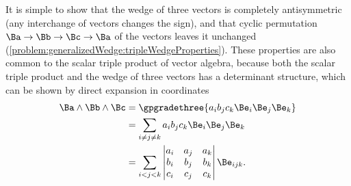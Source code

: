 It is simple to show that the wedge of three vectors is completely antisymmetric (any interchange of vectors changes the sign), and that cyclic permutation \( \Ba \rightarrow \Bb \rightarrow \Bc \rightarrow \Ba \) of the vectors leaves it unchanged
(\cref{problem:generalizedWedge:tripleWedgeProperties}).
These properties are also common to the scalar triple product of  vector algebra, because both the scalar triple product and the wedge of three vectors has a determinant structure, which can be shown by direct expansion in coordinates
\begin{equation}\label{eqn:generalizedWedge:620}
\begin{aligned}
\Ba \wedge \Bb \wedge \Bc
&= \gpgradethree{ a_i b_j c_k \Be_i \Be_j \Be_k } \\
&= \sum_{i \ne j \ne k} a_i b_j c_k \Be_i \Be_j \Be_k \\
&= \sum_{i < j < k}
   \begin{vmatrix}
   a_i & a_j & a_k \\
   b_i & b_j & b_k \\
   c_i & c_j & c_k \\
   \end{vmatrix}
   \Be_{i j k}.
\end{aligned}
\end{equation}

